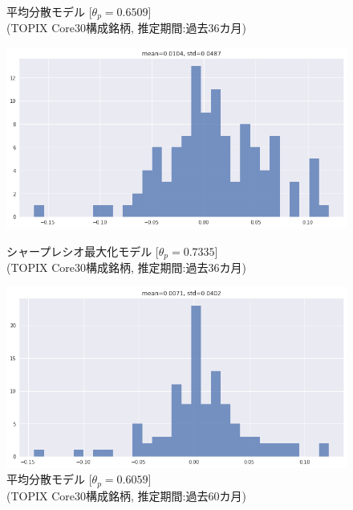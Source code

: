 \documentclass[dvipdfmx,autodetect-engine]{jsarticle}
\begin{document}
\begin{figure}[htbp]
\begin{minipage}{0.5\hsize}
\begin{center}
\end{center}
\caption{平均分散モデル [$\theta_p=0.6509$]\\(TOPIX Core30構成銘柄, 推定期間:過去36カ月)}
\label{fig:21}
\end{minipage}
\begin{minipage}{0.5\hsize}
\begin{center}
\includegraphics[width=1.0\hsize]{./figures/srmp_tpx30_w=36_hist.png}
\end{center}
\caption{シャープレシオ最大化モデル [$\theta_p=0.7335$]\\(TOPIX Core30構成銘柄, 推定期間:過去36カ月)}
\label{fig:22}
\end{minipage}
\begin{minipage}{0.5\hsize}
\begin{center}
\includegraphics[width=1.0\hsize]{./figures/mmvp_tpx30_w=60_hist.png}
\end{center}
\caption{平均分散モデル [$\theta_p=0.6059$]\\(TOPIX Core30構成銘柄, 推定期間:過去60カ月)}
\label{fig:31}
\end{minipage}
\begin{minipage}{0.5\hsize}

\end{minipage}
\end{figure}
\end{document}
